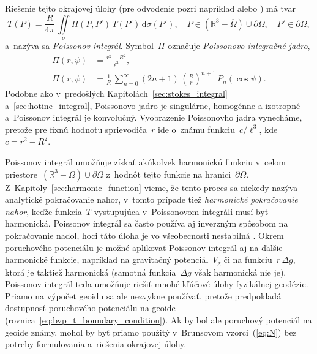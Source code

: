 \documentclass[a4paper, 12pt]{book}
\newcommand{\diff}{\mathrm d}
\newcommand{\gidx}{\mathrm g}
\begin{document}
Riešenie tejto okrajovej úlohy (pre odvodenie pozri napríklad 
\cite{MoritzPhysicalGeodesy} alebo \cite{SansoGeoidDetermination}) má tvar
%
\begin{equation}
\label{eq:poisson}
T(P) = \frac{R}{4\pi} \, \iint\limits_\sigma \Pi(P, P') \, T(P') \, 
\diff\sigma(P'){,} \quad P \in \left( \mathbb{R}^3 - \overline\Omega \right) 
\cup \partial\Omega{,} \quad P' \in \partial\Omega{,}
\end{equation}
%
a~nazýva sa \emph{Poissonov integrál}.  Symbol~$\Pi$ označuje \emph{Poissonovo 
integračné jadro},
%
\begin{align}
\Pi(r, \psi) &= \frac{r^2 - R^2}{\ell^3}{,}\label{eq:poisson_kernel}\\
\Pi(r, \psi) &= \frac{1}{R} \, \sum_{n = 0}^{\infty} (2n + 1) \, \left( 
\frac{R}{r} \right)^{n + 1} \, 
P_n(\cos\psi)\label{eq:poisson_kernel_spectral}{.}
\end{align}
%
Podobne ako v~predošlých Kapitolách~\ref{sec:stokes_integral} 
a~\ref{sec:hotine_integral}, Poissonovo jadro je singulárne, homogénne 
a izotropné a~Poissonov integrál je konvolučný.  Vyobrazenie Poissonovho jadra 
vynecháme, pretože pre fixnú hodnotu sprievodiča~$r$ ide o~známu funkciu~$c 
\slash \ell^3$, kde $c = r^2 - R^2$.

Poissonov integrál umožňuje získať akúkoľvek harmonickú funkciu v~celom 
priestore~$\left( \mathbb{R}^3 - \overline\Omega \right) \cup \partial\Omega$ 
z~hodnôt tejto funkcie na hranici~$\partial\Omega$.  
Z~Kapitoly~\ref{sec:harmonic_function} vieme, že tento proces sa niekedy nazýva 
analytické pokračovanie nahor, v~tomto prípade tiež \emph{harmonické 
pokračovanie nahor}, keďže funkcia~$T$ vystupujúca v~Poissonovom integráli musí 
byť harmonická.  Poissonov integrál sa často používa aj inverzným spôsobom na 
pokračovanie nadol, hoci táto úloha je vo všeobecnosti nestabilná 
\parencite{SansoGeodeticBoundaryValueProblem}.  Okrem poruchového potenciálu je 
možné aplikovať Poissonov integrál aj na ďalšie harmonické funkcie, napríklad 
na gravitačný potenciál~$V_\gidx$ či na funkciu~$r \, \Delta g$, ktorá je 
taktiež harmonická (samotná funkcia~$\Delta g$ však harmonická nie je).  
Poissonov integrál teda umožňuje riešiť mnohé kľúčové úlohy fyzikálnej 
geodézie.  Priamo na výpočet geoidu sa ale nezvykne používať, pretože 
predpokladá dostupnosť poruchového potenciálu na geoide 
(rovnica~\ref{eq:bvp_t_boundary_condition}).  Ak by bol ale poruchový potenciál 
na geoide známy, mohol by byť priamo použitý v~Brunsovom vzorci~(\ref{eq:N}) 
bez potreby formulovania a~riešenia okrajovej úlohy.
\end{document}
